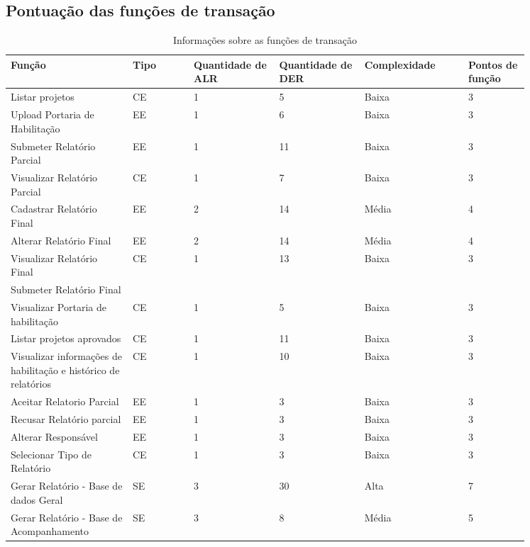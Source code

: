    \pagebreak
  
   \subsection{Pontuação das funções de transação}
    
	\begin{table*}[!h]
	\centering
	\caption{Informações sobre as funções de transação}
	\label{funcoes_transacao}
	  \begin{tabular}{p{0.20\linewidth}p{0.10\linewidth}p{0.14\linewidth}p{0.14\linewidth}p{0.17\linewidth}p{0.10\linewidth}}
	\hline
	\textbf{Função} & \textbf{Tipo} & \textbf{Quantidade de ALR} & \textbf{Quantidade de DER} & \textbf{Complexidade} & \textbf{Pontos de função} \\
	\hline
	Listar projetos & CE & 1 & 5 & Baixa & 3 \\
	\hline
	Upload Portaria de Habilitação & EE & 1 & 6 & Baixa & 3 \\
	\hline
	Submeter Relatório Parcial & EE & 1 & 11 & Baixa & 3 \\
	\hline
	Visualizar Relatório Parcial & CE & 1 & 7 & Baixa & 3 \\
	\hline
	Cadastrar Relatório Final & EE & 2 & 14 & Média & 4 \\
	\hline
	Alterar Relatório Final & EE & 2 & 14 & Média & 4 \\
	\hline
	Visualizar Relatório Final & CE & 1 & 13 & Baixa & 3 \\
	\hline
	Submeter Relatório Final &  &  &  &  &  \\
	\hline
	Visualizar Portaria de habilitação & CE & 1 & 5 & Baixa & 3 \\
	\hline
	Listar projetos aprovados & CE & 1 & 11 & Baixa & 3 \\
	\hline
	Visualizar informações de habilitação e histórico de relatórios & CE & 1 & 10 & Baixa & 3 \\
	\hline
	Aceitar Relatorio Parcial & EE & 1 & 3 & Baixa & 3 \\
	\hline
	Recusar Relatório parcial & EE & 1 & 3 & Baixa & 3\\
	\hline
	Alterar Responsável & EE & 1 & 3 & Baixa & 3\\
	\hline
	Selecionar Tipo de Relatório & CE& 1 & 3 & Baixa & 3\\
	\hline
	Gerar Relatório - Base de dados Geral & SE& 3 & 30 & Alta & 7\\
	\hline
	Gerar Relatório - Base de Acompanhamento & SE& 3 & 8 & Média & 5\\
	\hline
	\end{tabular}
	\end{table*}

